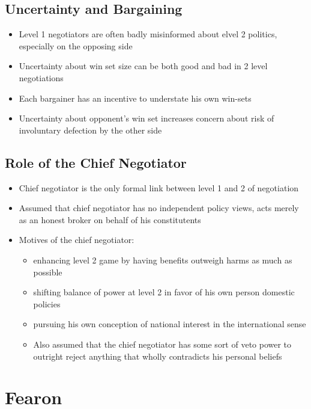 \documentclass[11pt]{article}
\begin{document}
\subsection{Uncertainty and Bargaining}
\label{sec:org2eced68}
\begin{itemize}
\item Level 1 negotiators are often badly misinformed about elvel 2 politics, especially on the opposing side
\item Uncertainty about win set size can be both good and bad in 2 level negotiations
\item Each bargainer has an incentive to understate his own win-sets
\item Uncertainty about opponent's win set increases concern about risk of involuntary defection by the other side
\end{itemize}
\subsection{Role of the Chief Negotiator}
\label{sec:orgead080b}
\begin{itemize}
\item Chief negotiator is the only formal link between level 1 and 2 of negotiation
\item Assumed that chief negotiator has no independent policy views, acts merely as an honest broker on behalf of his constitutents
\item Motives of the chief negotiator:
\begin{itemize}
\item enhancing level 2 game by having benefits outweigh harms as much as possible
\item shifting balance of power at level 2 in favor of his own person domestic policies
\item pursuing his own conception of national interest in the international sense
\end{itemize}
\begin{itemize}
\item Also assumed that the chief negotiator has some sort of veto power to outright reject anything that wholly contradicts his personal beliefs
\end{itemize}
\end{itemize}

\section{Fearon}
\label{sec:orgfb12dd9}
\end{document}
